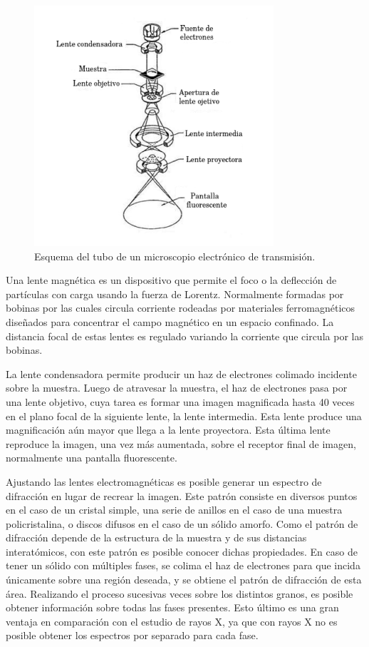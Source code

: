\documentclass[12pt]{article}
\theoremstyle{definition}
\theoremstyle{remark}
\begin{document}
{ \begin{figure}[H]
 	\centering
	\includegraphics[scale=0.9]{img/TEM.png}
 	\caption{Esquema del tubo de un microscopio electrónico de transmisión.}
	\label{TEM}
\end{figure} 

Una lente magnética es un dispositivo que permite el foco o la deflección de partículas con carga usando la fuerza de Lorentz. Normalmente formadas por bobinas por las cuales circula corriente rodeadas por materiales ferromagnéticos diseñados para concentrar el campo magnético en un espacio confinado. La distancia focal de estas lentes es regulado variando la corriente que circula por las bobinas.

La lente condensadora permite producir un haz de electrones colimado incidente sobre la muestra. Luego de atravesar la muestra, el haz de electrones pasa por una lente objetivo, cuya tarea es formar una imagen magnificada hasta 40 veces en el plano focal de la siguiente lente, la lente intermedia. Esta lente produce una magnificación aún mayor que llega a la lente proyectora. Esta última lente reproduce la imagen, una vez más aumentada, sobre el receptor final de imagen, normalmente una pantalla fluorescente.

Ajustando las lentes electromagnéticas es posible generar un espectro de difracción en lugar de recrear la imagen. Este patrón consiste en diversos puntos en el caso de un cristal simple, una serie de anillos en el caso de una muestra policristalina, o discos difusos en el caso de un sólido amorfo. Como el patrón de difracción depende de la estructura de la muestra y de sus distancias interatómicos, con este patrón es posible conocer dichas propiedades. En caso de tener un sólido con múltiples fases, se colima el haz de electrones para que incida únicamente sobre una región deseada, y se obtiene el patrón de difracción de esta área. Realizando el proceso sucesivas veces sobre los distintos granos, es posible obtener información sobre todas las fases presentes. Esto último es una gran ventaja en comparación con el estudio de rayos X, ya que con rayos X no es posible obtener los espectros por separado para cada fase.

}
\end{document}
